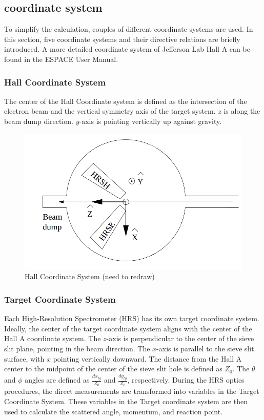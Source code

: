 \subsection{coordinate system}


To simplify the calculation, couples of different coordinate systems are used. In this section, five coordinate systems and their directive relations are briefly introduced. A more detailed coordinate system of Jefferson Lab Hall A can be found in the ESPACE User Manual\cite{espace2002manual}.  

\subsubsection{Hall Coordinate System}
The center of the Hall Coordinate system is defined as the intersection of the electron beam and the vertical symmetry axis of the target system. $z$ is along the beam dump direction. $y$-axis is pointing vertically up against gravity.

\begin{figure}[!h]
    \centering
    \includegraphics[scale = 0.40]{images/chap4/hall_coordinate_system.png}
    \caption{Hall Coordinate System (need to redraw)}
    \label{fig:hall_coordinate_system}
\end{figure}

\subsubsection{Target Coordinate System}

Each High-Resolution Spectrometer (HRS) has its own target coordinate system. Ideally, the center of the target coordinate system aligns with the center of the Hall A coordinate system. The $z$-axis is perpendicular to the center of the sieve slit plane, pointing in the beam direction. The $x$-axis is parallel to the sieve slit surface, with $x$ pointing vertically downward. The distance from the Hall A center to the midpoint of the center of the sieve slit hole is defined as $Z_0$. The $\theta$ and $\phi$ angles are defined as $\frac{dx_{tg}}{Z_0}$ and $\frac{dy_{tg}}{Z_0}$, respectively. During the HRS optics procedures, the direct measurements are transformed into variables in the Target Coordinate System. These variables in the Target coordinate system are then used to calculate the scattered angle, momentum, and reaction point.

